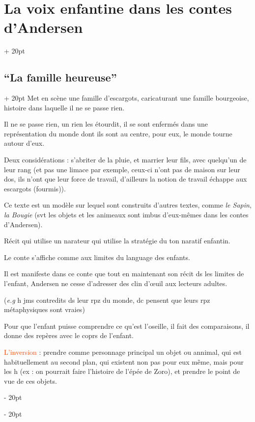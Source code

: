\documentclass[a4paper, 12pt, twoside]{article}
\renewcommand{\emph}{\textcolor{ff4500}}
\newcommand{\ind}[1][20pt]{\advance\leftskip + #1}
\newcommand{\deind}[1][20pt]{\advance\leftskip - #1}
\newenvironment{indt}[2][20pt]{#2 \par \ind[#1]}{\par \deind} %
\begin{document}
\begin{indt}{\section{La voix enfantine dans les contes d'Andersen}}
        \vspace{12pt}
        
        \begin{indt}{\subsection{``La famille heureuse''}}
            Met en scène une famille d'escargots, caricaturant une famille bourgeoise, histoire dans laquelle il ne se passe rien.
            
            Il ne se passe rien, un rien les étourdit, il se sont enfermés dans une représentation du monde dont ils sont au centre, pour eux, le monde tourne autour d'eux.
            
            Deux considérations : s'abriter de la pluie, et marrier leur fils, avec quelqu'un de leur rang (et pas  une limace par exemple, ceux-ci n'ont pas de maison sur leur dos, ils n'ont que leur force de travail, d'ailleurs la notion de travail échappe aux escargots (fourmis)).
            
            Ce texte est un modèle sur lequel sont construits d'autres textes, comme \textit{le Sapin}, \textit{la Bougie} (svt les objets et les animeaux sont imbus d'eux-mêmes dans les contes d'Andersen).
            
            Récit qui utilise un narateur qui utilise la stratégie du ton naratif enfantin.
            
            Le conte s'affiche comme aux limites du language des enfants.
            
            Il est manifeste dans ce conte que tout en maintenant son récit ds les limites de l'enfant, Andersen ne cesse d'adresser des clin d'\oe uil aux lecteurs adultes.
            
            (\textit{e.g} h jms contredits ds leur rpz du monde, dc pensent que leurs rpz métaphysiques sont vraies)
            
            Pour que l'enfant puisse comprendre ce qu'est l'oseille, il fait des comparaisons, il donne des repères avec le coprs de l'enfant.
            
            \vspace{12pt}
            
            \emph{L'inversion} : prendre comme personnage principal un objet ou annimal, qui est habituellement au second plan, qui existent non pas pour eux même, mais pour les h (ex : on pourrait faire l'histoire de l'épée de Zoro), et prendre le point de vue de ces objets.
            

\end{indt}
\end{indt}
\end{document}
